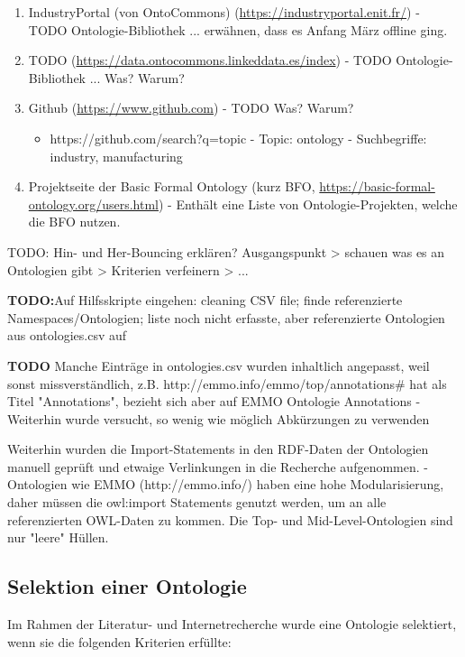 \documentclass{article}
\begin{document}
\begin{enumerate}
    \item IndustryPortal (von OntoCommons) (\url{https://industryportal.enit.fr/}) - TODO Ontologie-Bibliothek ... erwähnen, dass es Anfang März offline ging.
    \item TODO (\url{https://data.ontocommons.linkeddata.es/index}) - TODO Ontologie-Bibliothek ... Was? Warum?
    \item Github (\url{https://www.github.com}) - TODO Was? Warum?
       \begin{itemize}
           \item https://github.com/search?q=topic%
           - Topic: ontology
           - Suchbegriffe: industry, manufacturing
       \end{itemize}
    \item Projektseite der Basic Formal Ontology (kurz BFO, \url{https://basic-formal-ontology.org/users.html}) - Enthält eine Liste von Ontologie-Projekten, welche die BFO nutzen.
\end{enumerate}

TODO: Hin- und Her-Bouncing erklären? Ausgangspunkt > schauen was es an Ontologien gibt > Kriterien verfeinern > ...

\textbf{TODO:}Auf Hilfsskripte eingehen: cleaning CSV file; finde referenzierte Namespaces/Ontologien; liste noch nicht erfasste, aber referenzierte Ontologien aus ontologies.csv auf

\textbf{TODO} Manche Einträge in ontologies.csv wurden inhaltlich angepasst, weil sonst missverständlich, z.B. http://emmo.info/emmo/top/annotations# hat als Titel "Annotations", bezieht sich aber auf EMMO Ontologie Annotations
- Weiterhin wurde versucht, so wenig wie möglich Abkürzungen zu verwenden

Weiterhin wurden die Import-Statements in den RDF-Daten der Ontologien manuell geprüft und etwaige Verlinkungen in die Recherche aufgenommen.
- Ontologien wie EMMO (http://emmo.info/) haben eine hohe Modularisierung, daher müssen die owl:import Statements genutzt werden, um an alle referenzierten OWL-Daten zu kommen. Die Top- und Mid-Level-Ontologien sind nur "leere" Hüllen.


\subsection{Selektion einer Ontologie}

Im Rahmen der Literatur- und Internetrecherche wurde eine Ontologie selektiert, wenn sie die folgenden Kriterien erfüllte:
\end{document}
